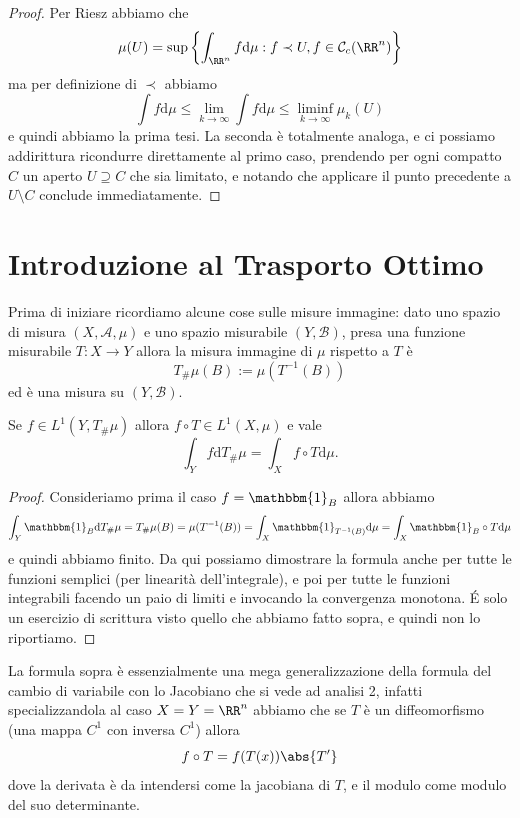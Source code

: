 \documentclass[11pt]{scrartcl}
\newcommand{\dif}{\text{d}}
\begin{document}
	\begin{proof}
		Per Riesz abbiamo che
		$$\mu(U)=\sup\left\{\int_{\RR^n}f\dif \mu:f\prec U,f\in \mathcal{C}_c(\RR^n)\right\}$$
		ma per definizione di $\prec$ abbiamo
		$$\int f \dif \mu \le \lim_{k\to\infty}\int f \dif \mu \le \liminf_{k\to\infty}\mu_k(U)$$
		e quindi abbiamo la prima tesi. La seconda è totalmente analoga, e ci possiamo addirittura ricondurre direttamente al primo caso, prendendo per ogni compatto $C$ un aperto $U\supseteq C$ che sia limitato, e notando che applicare il punto precedente a $U\setminus C$ conclude immediatamente.
	\end{proof}
	
	\newpage
	
	\section{Introduzione al Trasporto Ottimo}
	
	Prima di iniziare ricordiamo alcune cose sulle misure immagine: dato uno spazio di misura $(X,\mathcal{A},\mu)$ e uno spazio misurabile $\left(Y,\mathcal{B}\right)$, presa una funzione misurabile $T:X\to Y$ allora la misura immagine di $\mu$ rispetto a $T$ è
	$$T_\#\mu(B):=\mu\left(T^{-1}(B)\right)$$
	ed è una misura su $(Y,\mathcal{B})$.
	\begin{theorem}
		Se $f\in L^1(Y,T_\#\mu)$ allora $f\circ T\in L^1(X,\mu)$ e vale 
		$$\int_Y f\dif T_\#\mu=\int_X f\circ T\dif \mu.$$
	\end{theorem}
	\begin{proof}
		Consideriamo prima il caso $f=\mathbbm{1}_B$ allora abbiamo
		$$\int_Y\mathbbm{1}_B\dif T_\# \mu=T_\#\mu(B)=\mu(T^{-1}(B))=\int_X \mathbbm{1}_{T^{-1}(B)}\dif \mu = \int_X \mathbbm{1}_B\circ T\dif \mu$$
		e quindi abbiamo finito. Da qui possiamo dimostrare la formula anche per tutte le funzioni semplici (per linearità dell'integrale), e poi per tutte le funzioni integrabili facendo un paio di limiti e invocando la convergenza monotona. \'E solo un esercizio di scrittura visto quello che abbiamo fatto sopra, e quindi non lo riportiamo.
	\end{proof}
	La formula sopra è essenzialmente una mega generalizzazione della formula del cambio di variabile con lo Jacobiano che si vede ad analisi 2, infatti specializzandola al caso $X=Y=\RR^n$ abbiamo che se $T$ è un diffeomorfismo (una mappa $C^1$ con inversa $C^1$) allora
	$$f\circ T = f(T(x))\abs{T'}$$
	dove la derivata è da intendersi come la jacobiana di $T$, e il modulo come modulo del suo determinante.
	
\end{document}
